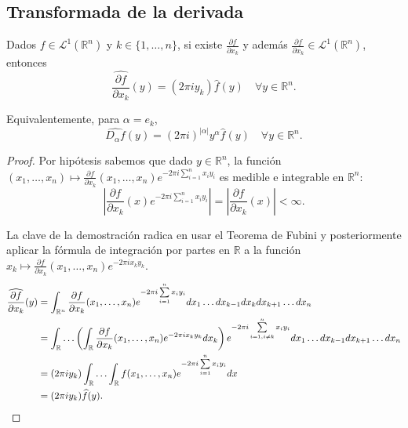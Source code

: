 \subsection{Transformada de la derivada}

\begin{teorema} \label{teoderi}
Dados $f \in  \mathscr{L}^1(\mathbb{R}^n)$ y $k \in \{1,\ldots,n\}$, si existe $ \frac{\partial f}{\partial x_k}$ y además  $ \frac{\partial f}{\partial x_k} \in \mathscr{L}^1(\mathbb{R}^n)$,
entonces
\begin{equation}
    \widehat{\frac{\partial{f}}{\partial{x_k}}}(y) = (2\pi iy_k) \widehat{f}(y)  \quad \forall y \in \mathbb{R}^n.
\end{equation}

\noindent Equivalentemente, para $\alpha = e_k$,
\begin{equation}
    \widehat{D_{\alpha}f}(y) = (2\pi i)^{|\alpha|} y^{\alpha} \widehat{f}(y) \quad \forall y \in \mathbb{R}^n.
\end{equation}
\end{teorema}

\begin{proof}
\noindent

\noindent Por hipótesis sabemos que dado $y \in \mathbb{R}^n$, la función $(x_1,\ldots,x_n) \mapsto  \frac{\partial{f}}{\partial{x_k}}(x_1,\ldots,x_n)e^{- 2 \pi i\sum\limits_{i=1}^{n} x_iy_i}$ es medible  e integrable en $\mathbb{R}^n$:
\begin{equation}
    \left|  \frac{\partial{f}}{\partial{x_k}}(x)e^{- 2 \pi i\sum\limits_{i=1}^{n} x_iy_i}\right| = \left| \frac{\partial{f}}{\partial{x_k}}(x) \right| < \infty.
\end{equation}

\noindent La clave de la demostración radica en usar el Teorema de Fubini y posteriormente aplicar la fórmula de integración por partes en $\mathbb{R}$ a la función $x_k \mapsto \frac{\partial{f}}{\partial{x_k}}(x_1,\ldots,x_n)e^{-2 \pi i x_ky_k}$.
\begin{align}
    \widehat{\frac{\partial{f}}{\partial{x_k}}}(y) 
    &= \int_{\mathbb{R}^n}\frac{\partial{f}}{\partial{x_k}}(x_1,\ldots,x_n)e^{- 2 \pi i\sum\limits_{i=1}^{n} x_iy_i}dx_1\ldots dx_{k-1}dx_kdx_{k+1}\ldots dx_n \\
    &= \int_{\mathbb{R}}\ldots\left(\int_{\mathbb{R}}\frac{\partial{f}}{\partial{x_k}}(x_1,\ldots,x_n)e^{-2 \pi i x_ky_k}dx_k\right) e^{- 2 \pi i\sum\limits_{i=1, i\neq k}^{n} x_iy_i} dx_1 \ldots dx_{k-1}dx_{k+1}\ldots dx_n \\
    &= (2 \pi i y_k)\int_{\mathbb{R}}\ldots\int_{\mathbb{R}} f(x_1,\ldots,x_n)e^{- 2 \pi i\sum\limits_{i=1}^{n} x_iy_i}dx \\
    &= (2\pi iy_k) \widehat{f}(y). \qedhere
\end{align}
\end{proof}




